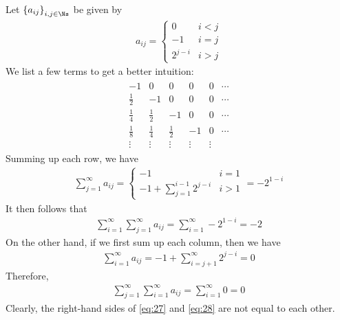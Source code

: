 \documentclass[thmcnt=section, 12pt]{elegantbook}
\begin{document}
\begin{example}
    Let $\left\{a_{ij}\right\}_{i,j \in \Ns}$ be given by 
    \begin{align*}
        a_{ij} = \begin{cases}
            0 &i < j \\ 
            -1 &i = j \\ 
            2^{j-i} &i > j 
        \end{cases}
    \end{align*}
    We list a few terms to get a better intuition:
    \begin{align*}
        \begin{array}{rrrrrr}
            -1 & 0 & 0 & 0 & 0 & \cdots \\ 
            \frac{1}{2} & -1 & 0 & 0 & 0 & \cdots \\ 
            \frac{1}{4} & \frac{1}{2} & -1 & 0 & 0 & \cdots \\ 
            \frac{1}{8} & \frac{1}{4} & \frac{1}{2} & -1 & 0 & \cdots \\
            \vdots & \vdots & \vdots & \vdots & \vdots &
        \end{array}
    \end{align*}
    Summing up each row, we have 
    \begin{align*}
        \sum_{j=1}^\infty a_{ij}
        = \begin{cases}
            -1 &i=1 \\ 
            -1 + \sum_{j=1}^{i-1} 2^{j-i} &i>1
        \end{cases}
        = -2^{1-i}
    \end{align*}
    It then follows that 
    \begin{align}
        \sum_{i=1}^\infty \sum_{j=1}^\infty a_{ij}
        = \sum_{i=1}^\infty -2^{1-i}
        = -2
        \label{eq:27}
    \end{align}
    On the other hand, if we first sum up each column, then we have 
    \begin{align*}
        \sum_{i=1}^\infty a_{ij}
        = -1 + \sum_{i=j+1}^\infty 2^{j-i}
        = 0
    \end{align*}
    Therefore,
    \begin{align}
        \sum_{j=1}^\infty \sum_{i=1}^\infty a_{ij}
        = \sum_{i=1}^\infty 0
        = 0
        \label{eq:28}
    \end{align}
    Clearly, the right-hand sides of \eqref{eq:27} and \eqref{eq:28} are not equal to each other.


\end{example}
\end{document}
